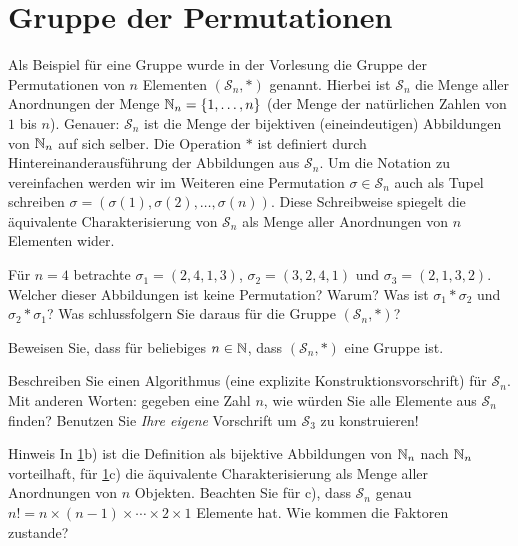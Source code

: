 \documentclass{scrartcl}
\newcommand{\permN}{\mathcal{S}_n}
\begin{document}
\maketitle

\section{Gruppe der Permutationen }
\label{groupperm}
Als Beispiel für eine Gruppe wurde in der Vorlesung die Gruppe der Permutationen von $n$ Elementen $(\permN{}, \ast)$ genannt.
Hierbei ist $\permN$ die Menge aller Anordnungen der Menge $\mathbb{N}_n = \{1,\ldots,n\}$ (der Menge der natürlichen Zahlen von $1$ bis $n$).
Genauer: $\permN$ ist die Menge der bijektiven (eineindeutigen) Abbildungen von $\mathbb{N}_n$ auf sich selber.
Die Operation $\ast$ ist definiert durch Hintereinanderausführung der Abbildungen aus $\permN$.
Um die Notation zu vereinfachen werden wir im Weiteren eine Permutation $\sigma \in \permN$ auch als Tupel schreiben $\sigma = (\sigma(1), \sigma(2), \ldots, \sigma(n))$.
Diese Schreibweise spiegelt die äquivalente Charakterisierung von $\permN$ als Menge aller Anordnungen von $n$ Elementen wider.
\begin{subex}
  \item{} Für $n=4$ betrachte $\sigma_1 = (2, 4, 1, 3)$, $\sigma_2 = (3, 2, 4 , 1)$ und $\sigma_3 = (2, 1, 3, 2)$.
  Welcher dieser Abbildungen ist keine Permutation?
  Warum?
  Was ist $\sigma_1 \ast \sigma_2$ und $\sigma_2 \ast \sigma_1$?
  Was schlussfolgern Sie daraus für die Gruppe $(\permN,\ast)$?
  \item{} Beweisen Sie, dass für beliebiges $n \in \mathbb{N}$, dass $(\permN,\ast)$ eine Gruppe ist.
  \item{} Beschreiben Sie einen Algorithmus (eine explizite Konstruktionsvorschrift) für $\permN$.
  Mit anderen Worten: gegeben eine Zahl $n$, wie würden Sie alle Elemente aus $\permN$ finden?
  Benutzen Sie \emph{Ihre eigene} Vorschrift um $\mathcal{S}_3$ zu konstruieren!
\end{subex}
\begin{remark}{Hinweis}
  In \ref{groupperm}b) ist die Definition als bijektive Abbildungen von $\mathbb{N}_n$ nach $\mathbb{N}_n$ vorteilhaft, für  \ref{groupperm}c) die äquivalente Charakterisierung als Menge aller Anordnungen von $n$ Objekten.
  Beachten Sie für c), dass $\permN$ genau $n! = n \times (n-1) \times \cdots \times 2 \times 1$ Elemente hat.
  Wie kommen die Faktoren zustande?
\end{remark}
\end{document}
